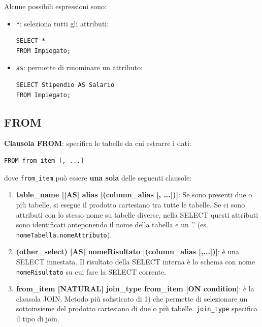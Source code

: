 \documentclass[a4paper,twoside]{article}
\begin{document}
\vspace{1em}
\noindent
Alcune possibili espressioni sono:
\begin{itemize}
  \item \texttt{*}: seleziona tutti gli attributi:
\begin{lstlisting}
SELECT *
FROM Impiegato;
\end{lstlisting}

  \item \texttt{as}: permette di rinominare un attributo:
\begin{lstlisting}
SELECT Stipendio AS Salario
FROM Impiegato;
\end{lstlisting}
\end{itemize}

\subsection{FROM}
\textbf{Clausola FROM}: specifica le tabelle da cui estrarre i dati:
\begin{lstlisting}
FROM from_item [, ...]
\end{lstlisting}
dove \texttt{from\_item} può essere \textbf{una sola} delle seguenti clausole:
\begin{enumerate}
  \item \textbf{table\_name [[AS] alias [(column\_alias [, ...])]}: Se sono presenti due
    o più tabelle, si esegue il prodotto cartesiano tra tutte le tabelle. Se ci sono
    attributi con lo stesso nome su tabelle diverse, nella SELECT questi attributi
    sono identificati anteponendo il nome della tabella e un '.' (es. \texttt{nomeTabella.nomeAttributo}).

  \item \textbf{(other\_select) [AS] nomeRisultato [(column\_alias [,...])]}: è una SELECT
    innestata. Il risultato della SELECT interna è lo schema con nome \texttt{nomeRisultato}
    su cui fare la SELECT corrente.

  \item \textbf{from\_item [NATURAL] join\_type from\_item [ON condition]}: è la clausola JOIN. Metodo
    più sofisticato di 1) che permette di selezionare un sottoinsieme del prodotto cartesiano
    di due o più tabelle. \texttt{join\_type} specifica il tipo di join.
\end{enumerate}
\end{document}
